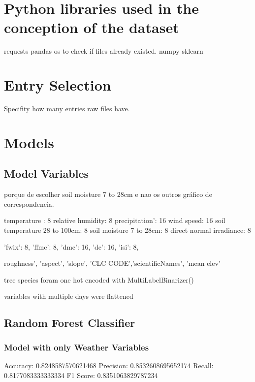 \section{Python libraries used in the conception of the dataset}
requests
pandas
os to check if files already existed.
numpy
sklearn



\section{Entry Selection}
Specifity how many entries raw files have.







\section{Models}

\subsection{Model Variables}

porque de escolher soil moisture 7 to 28cm e nao os outros gráfico de correspondencia.

temperature : 8
relative humidity: 8
precipitation': 16
wind speed: 16
soil temperature 28 to 100cm: 8
soil moisture 7 to 28cm: 8
direct normal irradiance: 8

'fwix': 8,
'ffmc': 8,
'dmc': 16,
'dc': 16,
'isi': 8,

roughness', 'aspect', 'slope', 'CLC CODE','scientificNames', 'mean elev'

tree species foram one hot encoded with MultiLabelBinarizer()

variables with multiple days were flattened

\subsection{Random Forest Classifier}



\subsubsection{Model with only Weather Variables}

Accuracy: 0.8248587570621468
Precision: 0.8532608695652174
Recall: 0.8177083333333334
F1 Score: 0.8351063829787234


